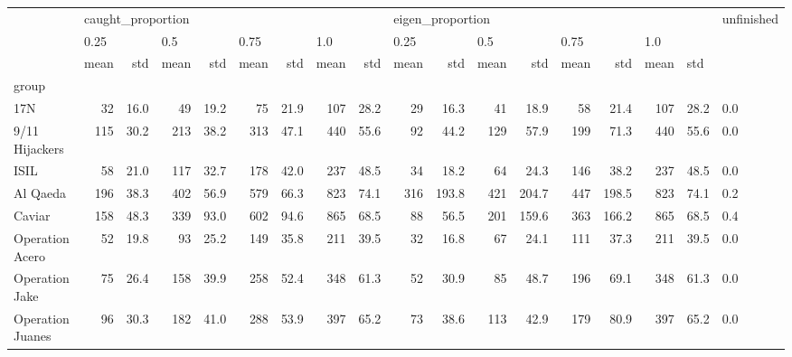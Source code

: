\begin{tabular}{lrrrrrrrrrrrrrrrrl}
\toprule
{} & \multicolumn{8}{l}{caught\_proportion} & \multicolumn{8}{l}{eigen\_proportion} & unfinished \\
{} & \multicolumn{2}{l}{0.25} & \multicolumn{2}{l}{0.5} & \multicolumn{2}{l}{0.75} & \multicolumn{2}{l}{1.0} & \multicolumn{2}{l}{0.25} & \multicolumn{2}{l}{0.5} & \multicolumn{2}{l}{0.75} & \multicolumn{3}{l}{1.0} \\
{} &              mean &   std & mean &   std & mean &   std & mean &   std &             mean &    std & mean &    std & mean &    std & mean & \multicolumn{2}{l}{std} \\
group                &                   &       &      &       &      &       &      &       &                  &        &      &        &      &        &      &       &            \\
\midrule
17N                  &                32 &  16.0 &   49 &  19.2 &   75 &  21.9 &  107 &  28.2 &               29 &   16.3 &   41 &   18.9 &   58 &   21.4 &  107 &  28.2 &        0.0 \\
9/11 Hijackers       &               115 &  30.2 &  213 &  38.2 &  313 &  47.1 &  440 &  55.6 &               92 &   44.2 &  129 &   57.9 &  199 &   71.3 &  440 &  55.6 &        0.0 \\
ISIL                 &                58 &  21.0 &  117 &  32.7 &  178 &  42.0 &  237 &  48.5 &               34 &   18.2 &   64 &   24.3 &  146 &   38.2 &  237 &  48.5 &        0.0 \\
Al Qaeda             &               196 &  38.3 &  402 &  56.9 &  579 &  66.3 &  823 &  74.1 &              316 &  193.8 &  421 &  204.7 &  447 &  198.5 &  823 &  74.1 &        0.2 \\
Caviar               &               158 &  48.3 &  339 &  93.0 &  602 &  94.6 &  865 &  68.5 &               88 &   56.5 &  201 &  159.6 &  363 &  166.2 &  865 &  68.5 &        0.4 \\
Operation Acero      &                52 &  19.8 &   93 &  25.2 &  149 &  35.8 &  211 &  39.5 &               32 &   16.8 &   67 &   24.1 &  111 &   37.3 &  211 &  39.5 &        0.0 \\
Operation Jake       &                75 &  26.4 &  158 &  39.9 &  258 &  52.4 &  348 &  61.3 &               52 &   30.9 &   85 &   48.7 &  196 &   69.1 &  348 &  61.3 &        0.0 \\
Operation Juanes     &                96 &  30.3 &  182 &  41.0 &  288 &  53.9 &  397 &  65.2 &               73 &   38.6 &  113 &   42.9 &  179 &   80.9 &  397 &  65.2 &        0.0 \\

\end{tabular}
